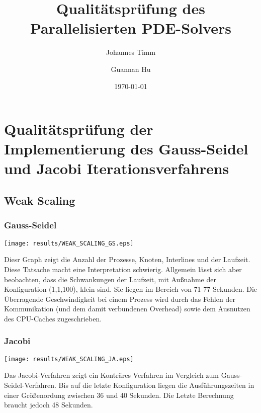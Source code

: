 \documentclass[a4paper,12pt]{scrartcl}
\title{Qualitätsprüfung des Parallelisierten PDE-Solvers}
\author{Johannes Timm \and Guannan Hu}
\date{\today}
\begin{document}
\maketitle
\notag

\section{Qualitätsprüfung der Implementierung des Gauss-Seidel und Jacobi Iterationsverfahrens}
\subsection{Weak Scaling}
\subsubsection{Gauss-Seidel}
\texttt{[image: results/WEAK\_SCALING\_GS.eps]}



Diesr Graph zeigt die Anzahl der Prozesse, Knoten, Interlines und der 
Laufzeit. Diese Tatsache macht eine Interpretation schwierig. 
Allgemein lässt sich aber beobachten, dass die Schwankungen der Laufzeit, mit Außnahme der Konfiguration (1,1,100), klein sind.
Sie liegen im Bereich von 71-77 Sekunden. Die Überragende Geschwindigkeit bei einem Prozess wird durch das Fehlen der Kommunikation (und dem damit verbundenen Overhead) sowie dem Ausnutzen des CPU-Caches zugeschrieben.
\subsubsection{Jacobi}
\texttt{[image: results/WEAK\_SCALING\_JA.eps]}


Das Jacobi-Verfahren zeigt ein Konträres Verfahren im Vergleich zum Gauss-Seidel-Verfahren. 
Bis auf die letzte Konfiguration liegen die Ausführungszeiten in einer Größenordung zwischen 36 und 40 Sekunden.
Die Letzte Berechnung braucht jedoch 48 Sekunden.
\end{document}
